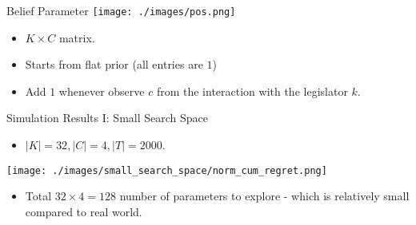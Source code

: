 \documentclass{beamer}
\begin{document}
	\begin{frame}{Belief Parameter}
		\centering	\texttt{[image: ./images/pos.png]}
		\begin{itemize}
			\item $K \times C$ matrix. 
			\item Starts from flat prior (all entries are $1$) 
			\item Add $1$ whenever observe $c$ from the interaction with the legislator $k$.
		\end{itemize}
	\end{frame}



	
	\begin{frame}{Simulation Results I: Small Search Space}
		\begin{itemize}
			\item  $|K|=32, |C|=4, |T|=2000$.
		\end{itemize}
		\centering	\texttt{[image: ./images/small\_search\_space/norm\_cum\_regret.png]}
		\begin{itemize}
			\item  Total $32 \times 4 = 128$ number of parameters to explore - which is relatively small compared to real world.
		\end{itemize}
	\end{frame}
\end{document}
